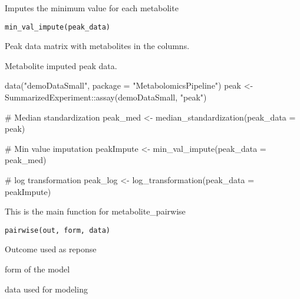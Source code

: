 \documentclass[a4paper]{book}
\begin{document}
%
\begin{Description}
Imputes the minimum value for each metabolite
\end{Description}
%
\begin{Usage}
\begin{verbatim}
min_val_impute(peak_data)
\end{verbatim}
\end{Usage}
%
\begin{Arguments}
\begin{ldescription}
\item[\code{peak\_data}] Peak data matrix with metabolites in the columns.
\end{ldescription}
\end{Arguments}
%
\begin{Value}
Metabolite imputed peak data.
\end{Value}
%
\begin{Examples}
\begin{ExampleCode}
data("demoDataSmall", package = "MetabolomicsPipeline")
peak <- SummarizedExperiment::assay(demoDataSmall, "peak")

# Median standardization
peak_med <- median_standardization(peak_data = peak)

# Min value imputation
peakImpute <- min_val_impute(peak_data = peak_med)

# log transformation
peak_log <- log_transformation(peak_data = peakImpute)

\end{ExampleCode}
\end{Examples}
%
\begin{Description}
This is the main function for metabolite\_pairwise
\end{Description}
%
\begin{Usage}
\begin{verbatim}
pairwise(out, form, data)
\end{verbatim}
\end{Usage}
%
\begin{Arguments}
\begin{ldescription}
\item[\code{out}] Outcome used as reponse

\item[\code{form}] form of the model

\item[\code{data}] data used for modeling
\end{ldescription}
\end{Arguments}
\end{document}
